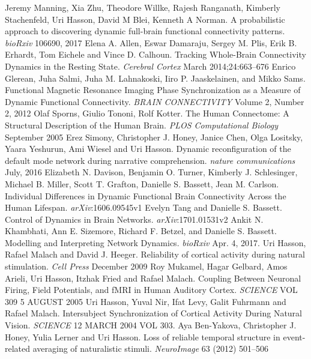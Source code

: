 \documentclass[12pt]{article}
\begin{document}
\begin{thebibliography}{1}
 Jeremy Manning, Xia Zhu, Theodore Willke, Rajesh Ranganath, Kimberly Stachenfeld, Uri Hasson, David M Blei, Kenneth A Norman. A probabilistic approach to discovering dynamic full-brain functional connectivity patterns. \textit{bioRxiv} 106690, 2017
 Elena A. Allen, Eswar Damaraju, Sergey M. Plis, Erik B. Erhardt, Tom Eichele and Vince D. Calhoun. Tracking Whole-Brain Connectivity Dynamics in the Resting State. \textit{Cerebral Cortex} March 2014;24:663–676
 Enrico Glerean, Juha Salmi, Juha M. Lahnakoski, Iiro P. Jaaskelainen, and Mikko Sams. Functional Magnetic Resonance Imaging Phase Synchronization as a Measure of Dynamic Functional Connectivity. \textit{BRAIN CONNECTIVITY} Volume 2, Number 2, 2012
 Olaf Sporns, Giulio Tononi, Rolf Kotter. The Human Connectome: A Structural Description of the Human Brain. \textit{PLOS Computational Biology} September 2005
 Erez Simony, Christopher J. Honey, Janice Chen, Olga Lositsky, Yaara Yeshurun, Ami Wiesel and Uri Hasson. Dynamic reconfiguration of the default mode network during narrative comprehension. \textit{nature communications} July, 2016
 Elizabeth N. Davison, Benjamin O. Turner, Kimberly J. Schlesinger, Michael B. Miller, Scott T. Grafton, Danielle S. Bassett, Jean M. Carlson. Individual Differences in Dynamic Functional Brain Connectivity Across the Human Lifespan. \textit{arXiv}:1606.09545v1
 Evelyn Tang and Danielle S. Bassett. Control of Dynamics in Brain Networks. \textit{arXiv}:1701.01531v2
 Ankit N. Khambhati, Ann E. Sizemore, Richard F. Betzel, and Danielle S. Bassett. Modelling and Interpreting Network Dynamics. \textit{bioRxiv} Apr. 4, 2017.
 Uri Hasson, Rafael Malach and David J. Heeger. Reliability of cortical activity during natural stimulation. \textit{Cell Press} December 2009
 Roy Mukamel, Hagar Gelbard, Amos Arieli, Uri Hasson, Itzhak Fried and Rafael Malach. Coupling Between Neuronal Firing, Field Potentials, and fMRI in Human Auditory Cortex. \textit{SCIENCE} VOL 309 5 AUGUST 2005
 Uri Hasson, Yuval Nir, Ifat Levy, Galit Fuhrmann and Rafael Malach. Intersubject Synchronization of Cortical Activity During Natural Vision. \textit{SCIENCE} 12 MARCH 2004 VOL 303.
 Aya Ben-Yakova, Christopher J. Honey, Yulia Lerner and Uri Hasson. Loss of reliable temporal structure in event-related averaging of naturalistic stimuli. \textit{NeuroImage} 63 (2012) 501–506

\end{thebibliography}
\end{document}
